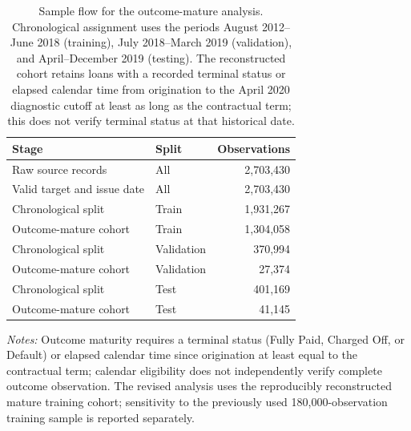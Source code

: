 \documentclass[10pt]{article}
\begin{document}
\begin{table}[!ht]
\centering
\caption{Sample flow for the outcome-mature analysis. Chronological assignment uses the periods August 2012--June 2018 (training), July 2018--March 2019 (validation), and April--December 2019 (testing). The reconstructed cohort retains loans with a recorded terminal status or elapsed calendar time from origination to the April 2020 diagnostic cutoff at least as long as the contractual term; this does not verify terminal status at that historical date.}
\label{tab:flow_mature}
\begin{tabular}{llr}
\toprule
Stage & Split & Observations \\
\midrule
Raw source records & All & 2,703,430 \\
Valid target and issue date & All & 2,703,430 \\
\midrule
Chronological split & Train & 1,931,267 \\
Outcome-mature cohort & Train & 1,304,058 \\
Chronological split & Validation & 370,994 \\
Outcome-mature cohort & Validation & 27,374 \\
Chronological split & Test & 401,169 \\
Outcome-mature cohort & Test & 41,145 \\
\bottomrule
\end{tabular}

\vspace{3pt}
{\footnotesize \textit{Notes:} Outcome maturity requires a terminal status (Fully Paid, Charged Off, or Default) or elapsed calendar time since origination at least equal to the contractual term; calendar eligibility does not independently verify complete outcome observation. The revised analysis uses the reproducibly reconstructed mature training cohort; sensitivity to the previously used 180,000-observation training sample is reported separately.}
\end{table}
\end{document}

